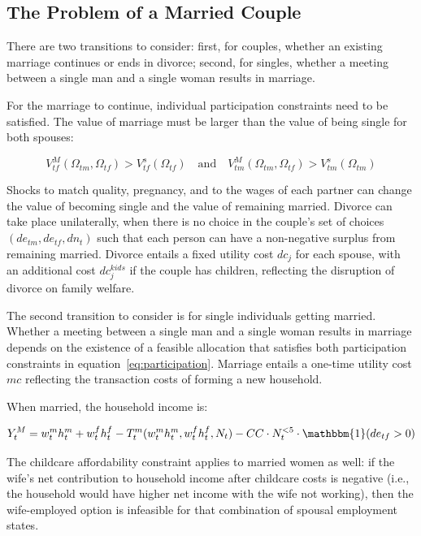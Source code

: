 \documentclass[12pt]{article}
\begin{document}
\subsection{The Problem of a Married Couple}

There are two transitions to consider: first, for couples, whether an existing marriage continues or ends in divorce; second, for singles, whether a meeting between a single man and a single woman results in marriage.

For the marriage to continue, individual participation constraints need to be satisfied. The value of marriage must be larger than the value of being single for both spouses:

\begin{equation}
V_{tf}^M(\Omega_{tm}, \Omega_{tf}) > V_{tf}^s(\Omega_{tf}) \quad \text{and} \quad V_{tm}^M(\Omega_{tm}, \Omega_{tf}) > V_{tm}^s(\Omega_{tm})
\label{eq:participation}
\end{equation}

Shocks to match quality, pregnancy, and to the wages of each partner can change the value of becoming single and the value of remaining married. Divorce can take place unilaterally, when there is no choice in the couple's set of choices $(de_{tm}, de_{tf}, dn_t)$ such that each person can have a non-negative surplus from remaining married. Divorce entails a fixed utility cost $dc_j$ for each spouse, with an additional cost $dc_j^{kids}$ if the couple has children, reflecting the disruption of divorce on family welfare.

The second transition to consider is for single individuals getting married. Whether a meeting between a single man and a single woman results in marriage depends on the existence of a feasible allocation that satisfies both participation constraints in equation~\eqref{eq:participation}. Marriage entails a one-time utility cost $mc$ reflecting the transaction costs of forming a new household.

When married, the household income is:

\begin{equation}
Y_t^M = w_t^m h_t^m + w_t^f h_t^f - T_t^m(w_t^m h_t^m, w_t^f h_t^f, N_t) - CC \cdot N_t^{<5} \cdot \mathbbm{1}(de_{tf} > 0)
\label{eq:married_income}
\end{equation}

The childcare affordability constraint applies to married women as well: if the wife's net contribution to household income after childcare costs is negative (i.e., the household would have higher net income with the wife not working), then the wife-employed option is infeasible for that combination of spousal employment states.
\end{document}
